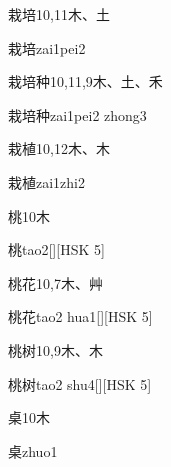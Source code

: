 \begin{entry}{栽培}{10,11}{⽊、⼟}
  \begin{phonetics}{栽培}{zai1pei2}
  \end{phonetics}
\end{entry}

\begin{entry}{栽培种}{10,11,9}{⽊、⼟、⽲}
  \begin{phonetics}{栽培种}{zai1pei2 zhong3}
  \end{phonetics}
\end{entry}

\begin{entry}{栽植}{10,12}{⽊、⽊}
  \begin{phonetics}{栽植}{zai1zhi2}
  \end{phonetics}
\end{entry}

\begin{entry}{桃}{10}{⽊}
  \begin{phonetics}{桃}{tao2}[][HSK 5]
  \end{phonetics}
\end{entry}

\begin{entry}{桃花}{10,7}{⽊、⾋}
  \begin{phonetics}{桃花}{tao2 hua1}[][HSK 5]
  \end{phonetics}
\end{entry}

\begin{entry}{桃树}{10,9}{⽊、⽊}
  \begin{phonetics}{桃树}{tao2 shu4}[][HSK 5]
  \end{phonetics}
\end{entry}

\begin{entry}{桌}{10}{⽊}
  \begin{phonetics}{桌}{zhuo1}
  \end{phonetics}
\end{entry}

